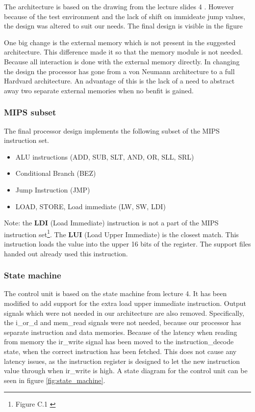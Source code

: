 The architecture is based on the drawing from the lecture slides 4 \cite{lecture-4}.
However because of the test environment and the lack of shift on immideate jump values,
the design was altered to suit our needs.
The final design is visible in the figure %

One big change is the external memory which is not present in the suggested architecture.
This difference made it so that the memory module is not needed.
Because all interaction is done with the external memory directly.
In changing the design the processor has gone from a von Neumann architecture to a full Hardvard architecture.
An advantage of this is the lack of a need to abstract away two separate external memories when no benfit is gained.

\subsubsection{MIPS subset}

The final processor design implements the following subset of the MIPS instruction set.

\begin{itemize}
    \item ALU instructions (ADD, SUB, SLT, AND, OR, SLL, SRL)
    \item Conditional Branch (BEZ)
    \item Jump Instruction (JMP)
    \item LOAD, STORE, Load immediate (LW, SW, LDI)
\end{itemize}

Note: the {\bf LDI} (Load Immediate) instruction is not a part of the MIPS instruction set\footnote{Figure C.1 \cite[p.66]{compendium}}.
The {\bf LUI} (Load Upper Immediate) is the closest match.
This instruction loads the value into the upper 16 bits of the register.
The support files handed out already used this instruction.

\subsubsection{State machine}

The control unit is based on the state machine from lecture 4. \cite{lecture-4}
It has been modified to add support for the extra load upper immediate instruction.
Output signals which were not needed in our architecture are also removed.
Specifically, the i\_or\_d and mem\_read signals were not needed, because our processor has separate instruction and data memories.
Because of the latency when reading from memory the ir\_write signal has been moved to the instruction\_decode state, when the correct instruction has been fetched.
This does not cause any latency issues, as the instruction register is designed to let the new instruction value through when ir\_write is high.
A state diagram for the control unit can be seen in figure \ref{fig:state_machine}.

